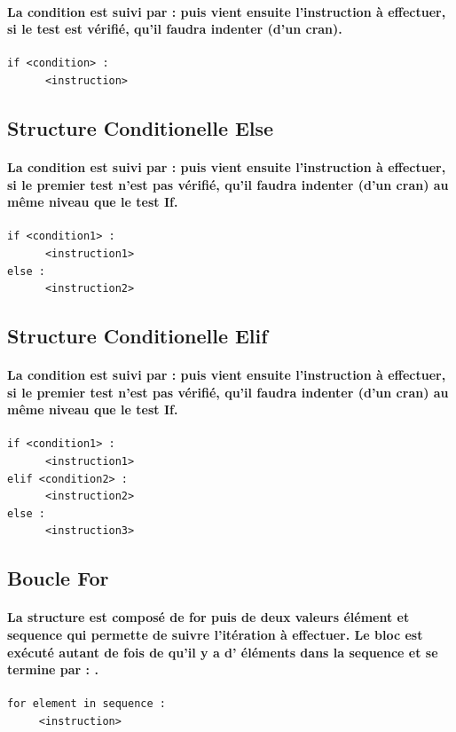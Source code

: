 \documentclass[a4paper, 12pt, twoside]{article}
\begin{document}
\paragraph{La condition est suivi par  :  puis vient ensuite l'instruction à effectuer, si le test est vérifié, qu'il faudra indenter (d'un cran).}
\begin{verbatim}
if <condition> :
      <instruction>
\end{verbatim}
\subsection{ Structure Conditionelle Else}
\paragraph{La condition est suivi par  :  puis vient ensuite l'instruction à effectuer, si le premier test n'est pas vérifié, qu'il faudra indenter (d'un cran) au même niveau que le test If.}
\begin{verbatim}
if <condition1> :
      <instruction1>
else :
      <instruction2>
\end{verbatim}
\subsection{ Structure Conditionelle Elif }
\paragraph{La condition est suivi par  :  puis vient ensuite l'instruction à effectuer, si le premier test n'est pas vérifié, qu'il faudra indenter (d'un cran) au même niveau que le test If.}
\begin{verbatim}
if <condition1> :
      <instruction1>
elif <condition2> :
      <instruction2>
else : 
      <instruction3>
\end{verbatim}
\subsection{ Boucle For}
\paragraph{La structure est composé de for puis de deux valeurs élément et sequence qui permette de suivre l'itération à effectuer. Le bloc 
est exécuté autant de fois de qu'il y a d' éléments dans la sequence et se termine par  : .}
\begin{verbatim}
for element in sequence :
     <instruction>
\end{verbatim}
\end{document}

